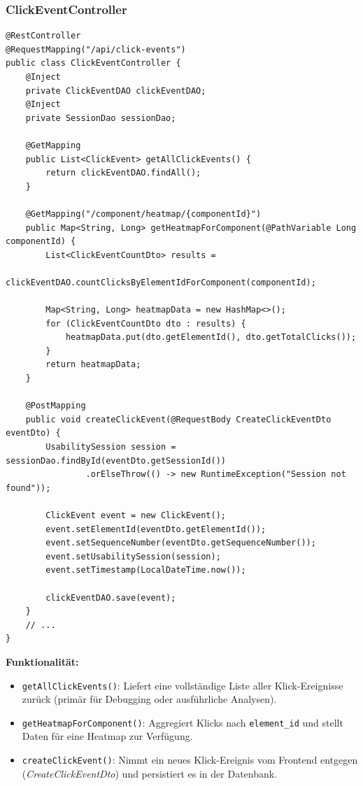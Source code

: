 \documentclass[12pt,oneside]{article}
\begin{document}
\subsubsection{ClickEventController}
\lstset{style=java}
\begin{lstlisting}
@RestController
@RequestMapping("/api/click-events")
public class ClickEventController {
    @Inject
    private ClickEventDAO clickEventDAO;
    @Inject
    private SessionDao sessionDao;

    @GetMapping
    public List<ClickEvent> getAllClickEvents() {
        return clickEventDAO.findAll();
    }

    @GetMapping("/component/heatmap/{componentId}")
    public Map<String, Long> getHeatmapForComponent(@PathVariable Long componentId) {
        List<ClickEventCountDto> results =
            clickEventDAO.countClicksByElementIdForComponent(componentId);

        Map<String, Long> heatmapData = new HashMap<>();
        for (ClickEventCountDto dto : results) {
            heatmapData.put(dto.getElementId(), dto.getTotalClicks());
        }
        return heatmapData;
    }

    @PostMapping
    public void createClickEvent(@RequestBody CreateClickEventDto eventDto) {
        UsabilitySession session = sessionDao.findById(eventDto.getSessionId())
                .orElseThrow(() -> new RuntimeException("Session not found"));

        ClickEvent event = new ClickEvent();
        event.setElementId(eventDto.getElementId());
        event.setSequenceNumber(eventDto.getSequenceNumber());
        event.setUsabilitySession(session);
        event.setTimestamp(LocalDateTime.now());

        clickEventDAO.save(event);
    }
    // ...
}
\end{lstlisting}

\noindent
\textbf{Funktionalität:}
\begin{itemize}
    \item \lstinline|getAllClickEvents()|: Liefert eine vollständige Liste aller Klick-Ereignisse zurück (primär für Debugging oder ausführliche Analysen).
    \item \lstinline|getHeatmapForComponent()|: Aggregiert Klicks nach \lstinline|element_id| und stellt Daten für eine Heatmap zur Verfügung.
    \item \lstinline|createClickEvent()|: Nimmt ein neues Klick-Ereignis vom Frontend entgegen (\emph{CreateClickEventDto}) und persistiert es in der Datenbank.
\end{itemize}
\end{document}
